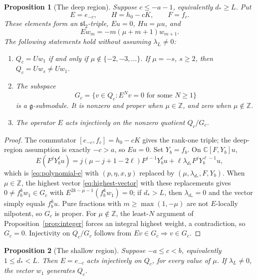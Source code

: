 \documentclass[11pt,a4paper]{article}
\newcommand{\C}{\mathbb C}
\newcommand{\Z}{\mathbb Z}
\newcommand{\g}{\mathfrak g}
\newcommand{\slc}{\mathfrak{sl}_2}
\theoremstyle{plainupright}
\newtheorem{proposition}{Proposition}[section]
\begin{document}
\begin{proposition}[The deep region]\label{prop:deep}
Suppose \(c\le-a-1\), equivalently \(d_*\ge L\). Put
\[
E=e_{-c},\qquad H=h_0-cK,\qquad F=f_c.
\]
These elements form an \(\slc\)-triple, \(Eu=0\), \(Hu=\mu u\), and
\[
Ew_m=-m(\mu+m+1)w_{m+1}.
\]
The following statements hold without assuming \(\lambda_L\ne0\):
\begin{enumerate}[label=(\roman*)]
\item \(Q_c=Uw_1\) if and only if \(\mu\notin\{-2,-3,\ldots\}\).
If \(\mu=-s\), \(s\ge2\), then \(Q_c=Uw_s\ne Uw_1\).
\item The subspace
\[
G_c=\{v\in Q_c:E^Nv=0\text{ for some }N\ge1\}
\]
is a \(\g\)-submodule. It is nonzero and proper when \(\mu\in\Z\), and zero
when \(\mu\notin\Z\).
\item The operator \(E\) acts injectively on the nonzero quotient
\(Q_c/G_c\).
\end{enumerate}
\end{proposition}

\begin{proof}
The commutator \([e_{-c},f_c]=h_0-cK\) gives the rank-one triple; the
deep-region assumption is exactly \(-c>a\), so \(Eu=0\). Set \(Y_b=f_b\). On
\(\C[F,Y_b]u\),
\begin{equation}\label{eq:deep-poly}
E(F^jY_b^\ell u)
=j(\mu-j+1-2\ell)F^{j-1}Y_b^\ell u
+\ell\lambda_{d_*}F^jY_b^{\ell-1}u,
\end{equation}
which is \eqref{eq:polynomial-e} with
\((p,\eta,x,y)\) replaced by \((\mu,\lambda_{d_*},F,Y_b)\). When \(\mu\in\Z\),
the highest vector \eqref{eq:highest-vector} with these replacements gives
\(0\ne f_b^kw_1\in G_c\) with \(E^{2k-\mu-1}(f_b^kw_1)=0\); if \(d_*>L\),
then \(\lambda_{d_*}=0\) and the vector simply equals \(f_b^ku\). Pure
fractions with \(m\ge\max(1,-\mu)\) are not \(E\)-locally nilpotent, so
\(G_c\) is proper. For \(\mu\notin\Z\), the least-\(N\) argument of
Proposition~\ref{prop:integer} forces an integral highest weight, a
contradiction, so \(G_c=0\). Injectivity on \(Q_c/G_c\) follows from
\(Ev\in G_c\Rightarrow v\in G_c\).
\end{proof}

\begin{proposition}[The shallow region]\label{prop:shallow}
Suppose \(-a\le c<b\), equivalently \(1\le d_*<L\).
Then \(E=e_{-c}\) acts injectively on \(Q_c\), for every value of \(\mu\).
If \(\lambda_L\ne0\), the vector \(w_1\) generates \(Q_c\).
\end{proposition}
\end{document}
